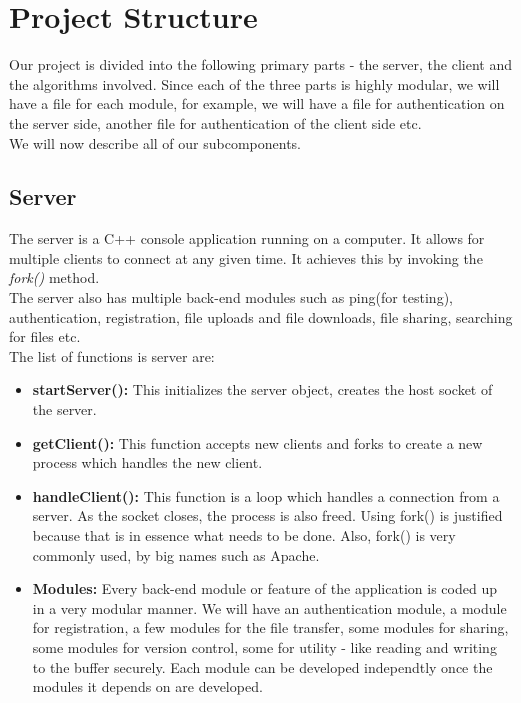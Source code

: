 \documentclass[]{article}
\begin{document}
\section{\LARGE Project Structure}
Our project is divided into the following primary parts - the server, the client and the algorithms involved.
Since each of the three parts is highly modular, we will have a file for each module, for example, we will have a file for authentication on the server side, another file for authentication of the client side etc. \\
We will now describe all of our subcomponents.
\subsection{Server}
The server is a C++ console application running on a computer. It allows for multiple clients to connect at any given time. It achieves this by invoking the \textit{fork()} method. \\
The server also has multiple back-end modules such as ping(for testing), authentication, registration, file uploads and file downloads, file sharing, searching for files etc. \\
The list of functions is server are:
\begin{itemize}
\item \textbf{startServer():}  This initializes the server object, creates the host socket of the server. 
\item \textbf{getClient():}    This function accepts new clients and forks to create a new process which handles the new client.
\item \textbf{handleClient():} This function is a loop which handles a connection from a server. As the socket closes, the process is also freed. Using fork() is justified because that is in essence what needs to be done. Also, fork() is very commonly used, by big names such as Apache.
\item \textbf{Modules:}
Every back-end module or feature of the application is coded up in a very modular manner. We will have an authentication module, a module for registration, a few modules for the file transfer, some modules for sharing, some modules for version control, some for utility - like reading and writing to the buffer securely. Each module can be developed independtly once the modules it depends on are developed.
\end{itemize}
\end{document}
